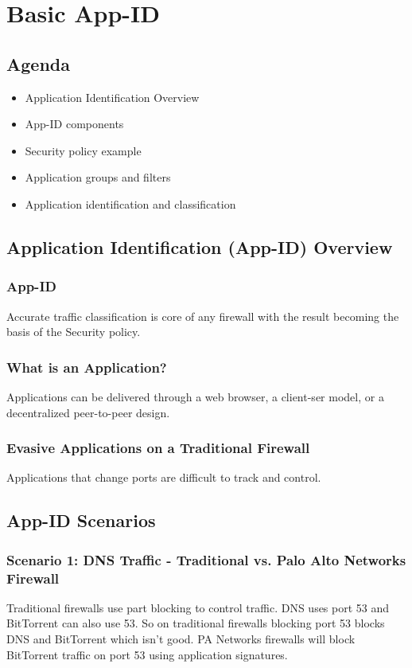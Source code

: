 \section{Basic App-ID}
\subsection{Agenda}
    \begin{itemize}
        \item Application Identification Overview
        \item App-ID components
        \item Security policy example
        \item Application groups and filters
        \item Application identification and classification
    \end{itemize}

\subsection{Application Identification (App-ID) Overview}
\subsubsection{App-ID}
Accurate traffic classification is core of any firewall with the result becoming the basis of the Security policy.

\subsubsection{What is an Application?}
Applications can be delivered through a web browser, a client-ser model, or a decentralized peer-to-peer design. 

\subsubsection{Evasive Applications on a Traditional Firewall}
Applications that change ports are difficult to track and control. 

\subsection{App-ID Scenarios}
\subsubsection{Scenario 1:  DNS Traffic - Traditional vs. Palo Alto Networks Firewall}
Traditional firewalls use part blocking to control traffic. DNS uses port 53 and BitTorrent can also use 53. So on traditional firewalls blocking port 53 blocks DNS and BitTorrent which isn't good. PA Networks firewalls will block BitTorrent traffic on port 53 using application signatures.

